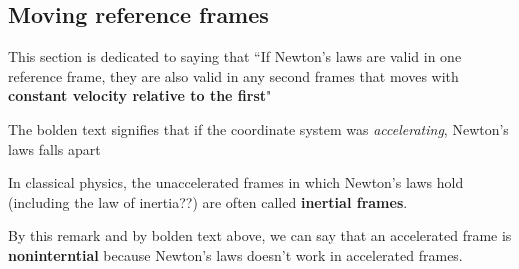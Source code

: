 \subsection{Moving reference frames}

This section is dedicated to saying that ``If Newton's laws are valid in one reference frame, they are also valid in any second frames that moves with \textbf{constant velocity relative to the first}"

The bolden text signifies that if the coordinate system was \textit{accelerating}, Newton's laws falls apart

\begin{rmk}
    In classical physics, the unaccelerated frames in which Newton's laws hold (including the law of inertia??) are often called \textbf{inertial frames}.

    By this remark and by bolden text above, we can say that an accelerated frame is \textbf{noninterntial} because Newton's laws doesn't work in accelerated frames.
\end{rmk}